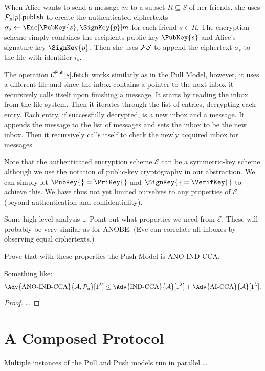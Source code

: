 When Alice wants to send a message \(m\) to a subset \(R\subseteq S\) of her 
friends, she uses \(\pnpub{p}\) to create the authenticated ciphertexts 
\(\sigma_s\gets \Enc[\PubKey{s}, \SignKey{p}]{m}\) for each friend \(s\in R\).
The encryption scheme simply combines the recipients public key \(\PubKey{s}\) 
and Alice's signature key \(\SignKey{p}\).
Then she uses \(\FS\) to append the ciphertext \(\sigma_s\) to the file with 
identifier \(i_s\).

The operation \(\pget{s}\) works similarly as in the Pull Model, however, it 
uses a different file and since the inbox contains a pointer to the next inbox 
it recursively calls itself upon finishing a message.
It starts by reading the inbox from the file system.
Then it iterates through the list of entries, decrypting each entry.
Each entry, if successfully decrypted, is a new inbox and a message.
It appends the message to the list of messages and sets the inbox to be the new
inbox.
Then it recursively calls itself to check the newly acquired inbox for 
messages.

Note that the authenticated encryption scheme \(\mathcal{E}\) can be 
a symmetric-key scheme although we use the notation of public-key cryptography 
in our abstraction.
We can simply let \(\PubKey{} = \PriKey{}\) and \(\SignKey{} = \VerifKey{}\) to 
achieve this.
We have thus not yet limited ourselves to any properties of \(\mathcal{E}\) 
(beyond authentication and confidentiality).

Some high-level analysis \dots
Point out what properties we need from \(\mathcal{E}\).
These will probably be very similar as for \ac{ANOBE}.
(Eve can correlate all inboxes by observing equal ciphertexts.)

Prove that with these properties the Push Model is ANO-IND-CCA\@.
\begin{theorem}
  Something like:
  \[\Adv{\text{ANO-IND-CCA}}{\A, \PushOp}[1^\lambda]\leq 
    \Adv{\text{IND-CCA}}{\A}[1^\lambda] + \Adv{\text{AI-CCA}}{\A}[1^\lambda].\]
\end{theorem}
\begin{proof}
  \dots
\end{proof}


\section{A Composed Protocol}
\label{Composed}

Multiple instances of the Pull and Push models run in parallel \dots


